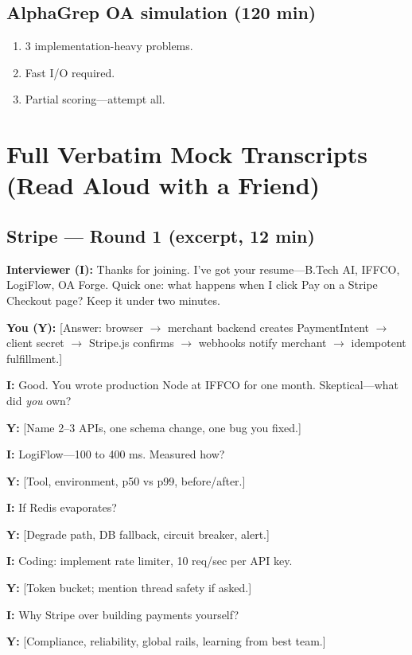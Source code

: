 \documentclass[9pt,a4paper]{article}
\begin{document}
\subsection{AlphaGrep OA simulation (120 min)}
\begin{enumerate}
  \item 3 implementation-heavy problems.
  \item Fast I/O required.
  \item Partial scoring---attempt all.
\end{enumerate}
\newpage
\section{Full Verbatim Mock Transcripts (Read Aloud with a Friend)}
\subsection{Stripe --- Round 1 (excerpt, 12 min)}

\textbf{Interviewer (I):} Thanks for joining. I've got your resume---B.Tech AI, IFFCO, LogiFlow, OA Forge. Quick one: what happens when I click Pay on a Stripe Checkout page? Keep it under two minutes.

\textbf{You (Y):} [Answer: browser $\rightarrow$ merchant backend creates PaymentIntent $\rightarrow$ client secret $\rightarrow$ Stripe.js confirms $\rightarrow$ webhooks notify merchant $\rightarrow$ idempotent fulfillment.]

\textbf{I:} Good. You wrote production Node at IFFCO for one month. Skeptical---what did \emph{you} own?

\textbf{Y:} [Name 2--3 APIs, one schema change, one bug you fixed.]

\textbf{I:} LogiFlow---100 to 400 ms. Measured how?

\textbf{Y:} [Tool, environment, p50 vs p99, before/after.]

\textbf{I:} If Redis evaporates?

\textbf{Y:} [Degrade path, DB fallback, circuit breaker, alert.]

\textbf{I:} Coding: implement rate limiter, 10 req/sec per API key.

\textbf{Y:} [Token bucket; mention thread safety if asked.]

\textbf{I:} Why Stripe over building payments yourself?

\textbf{Y:} [Compliance, reliability, global rails, learning from best team.]
\end{document}
